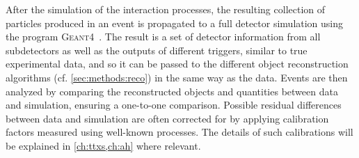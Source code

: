 After the simulation of the interaction processes, the resulting collection of particles produced in an event is propagated to a full detector simulation using the program \textsc{Geant4}~\cite{GEANT4:2002}. 
The result is a set of detector information from all subdetectors as well as the outputs of different triggers, similar to true experimental data, and so it can be passed to the different object reconstruction algorithms (cf. \cref{sec:methods:reco}) in the same way as the data. Events are then analyzed by comparing the reconstructed objects and quantities between data and simulation, ensuring a one-to-one comparison. Possible residual differences between data and simulation are often corrected for by applying calibration factors measured using well-known processes. The details of such calibrations will be explained in \cref{ch:ttxs,ch:ah} where relevant.